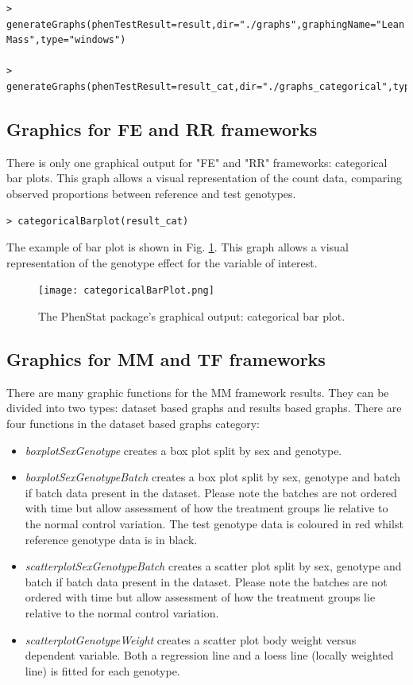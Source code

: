 \documentclass[12pt,a4paper]{article}
\begin{document}
\begingroup
    \fontsize{8pt}{12pt}\selectfont
\begin{verbatim}
> generateGraphs(phenTestResult=result,dir="./graphs",graphingName="Lean Mass",type="windows")

> generateGraphs(phenTestResult=result_cat,dir="./graphs_categorical",type="windows")
\end{verbatim}
\endgroup 

\subsection{Graphics for FE and RR frameworks}
There is only one graphical output for "FE" and "RR" frameworks: categorical bar plots. This graph allows a visual representation of the count data, comparing observed proportions between reference and test genotypes.  


\begingroup
    \fontsize{8pt}{12pt}\selectfont
\begin{verbatim}
> categoricalBarplot(result_cat)
\end{verbatim}
\endgroup 

The example of bar plot is shown in Fig. \ref{fig:06}. This graph allows a visual representation of the genotype effect for the variable of interest.
\begin{figure}[!htpb]%
\centerline{\texttt{[image: categoricalBarPlot.png]}}
\caption{The PhenStat package's graphical output: categorical bar plot.}\label{fig:06}
\end{figure}

\subsection{Graphics for MM and TF frameworks}
There are many graphic functions for the MM framework results. They can be divided into two types: dataset based graphs and results based graphs.
There are four functions in the dataset based graphs category:
\begin{itemize}
\item \textit{boxplotSexGenotype} creates a box plot split by sex and genotype.
\item \textit{boxplotSexGenotypeBatch} creates a box plot split by sex, genotype and batch if batch data present in the dataset. Please note the batches are not ordered with time but allow assessment of how the treatment groups lie relative to the normal control variation. The test genotype data is coloured in red whilst reference genotype data is in black. 
\item \textit{scatterplotSexGenotypeBatch} creates a scatter plot split by sex, genotype and batch if batch data present in the dataset. Please note the batches are not ordered with time but allow assessment of how the treatment groups lie relative to the normal control variation.
\item \textit{scatterplotGenotypeWeight} creates a scatter plot body weight versus dependent variable. Both a regression line and a loess line (locally weighted line) is fitted for each genotype. 
\end{itemize}
\end{document}
